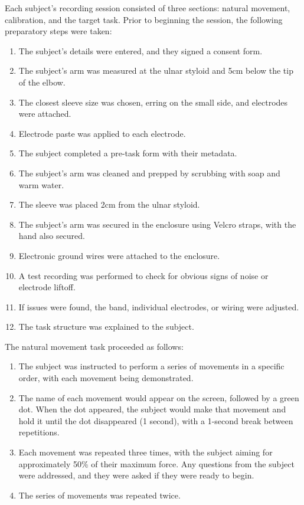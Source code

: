 \documentclass[../main.tex]{subfiles}
\begin{document}
Each subject's recording session consisted of three sections: natural movement, calibration, and the target task. Prior to beginning the session, the following preparatory steps were taken:
%
\begin{enumerate}
  \item The subject's details were entered, and they signed a consent form.
  \item The subject's arm was measured at the ulnar styloid and 5cm below the tip of the elbow.
  \item The closest sleeve size was chosen, erring on the small side, and electrodes were attached.
  \item Electrode paste was applied to each electrode.
  \item The subject completed a pre-task form with their metadata.
  \item The subject's arm was cleaned and prepped by scrubbing with soap and warm water.
  \item The sleeve was placed 2cm from the ulnar styloid.
  \item The subject's arm was secured in the enclosure using Velcro straps, with the hand also secured.
  \item Electronic ground wires were attached to the enclosure.
  \item A test recording was performed to check for obvious signs of noise or electrode liftoff.
  \item If issues were found, the band, individual electrodes, or wiring were adjusted.
  \item The task structure was explained to the subject.
\end{enumerate}
%
The natural movement task proceeded as follows:
%
\begin{enumerate}
  \item The subject was instructed to perform a series of movements in a specific order, with each movement being demonstrated.
  \item The name of each movement would appear on the screen, followed by a green dot. When the dot appeared, the subject would make that movement and hold it until the dot disappeared (1 second), with a 1-second break between repetitions.
  \item Each movement was repeated three times, with the subject aiming for approximately 50\% of their maximum force.
  Any questions from the subject were addressed, and they were asked if they were ready to begin.
  \item The series of movements was repeated twice.
\end{enumerate}
\end{document}
